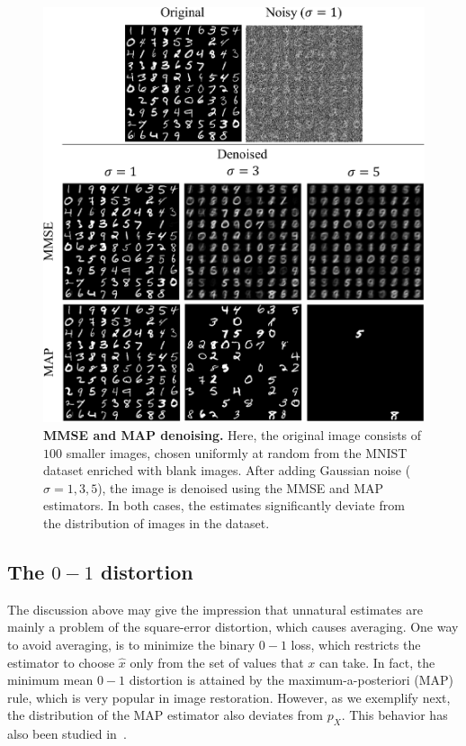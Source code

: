 \begin{figure}
	\begin{center}
		\includegraphics[width=0.93\linewidth]{figures/MMSE_MAP.pdf}
	\end{center}
	\caption{\textbf{MMSE and MAP denoising.} Here, the original image consists of $100$ smaller images, chosen uniformly at random from the MNIST dataset enriched with blank images. After adding Gaussian noise ($\sigma=1,3,5$), the image is denoised using the MMSE and MAP estimators. In both cases, the estimates significantly deviate from the distribution of images in the dataset.}
	\label{fig:MMSE_MAP}
\end{figure}

\subsection{The $0-1$ distortion}\label{subsec:MMSEMAP2}
The discussion above may give the impression that unnatural estimates are mainly a problem of the square-error distortion, which causes averaging. One way to avoid averaging, is to minimize the binary $0-1$ loss, which restricts the estimator to choose $\hat{x}$ only from the set of values that $x$ can take. In fact, the minimum mean $0-1$ distortion is attained by the maximum-a-posteriori (MAP) rule, which is very popular in image restoration. However, as we exemplify next, the distribution of the MAP estimator also deviates from $p_X$. This behavior has also been studied in~\cite{nikolova2007model}.

